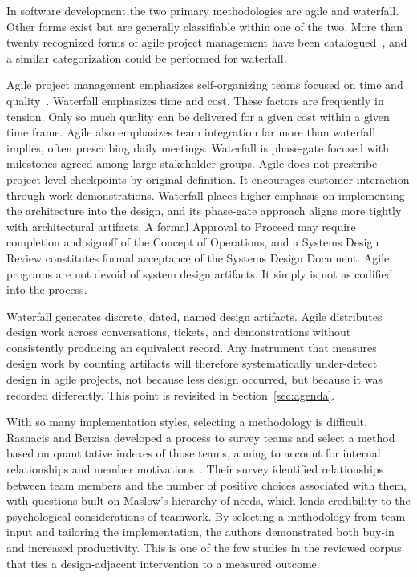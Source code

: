 \documentclass{csimq}
\begin{document}
In software development the two primary methodologies are agile and waterfall.
Other forms exist but are generally classifiable within one of the two. More
than twenty recognized forms of agile project management have been
catalogued~\cite{rasnacis2017}, and a similar categorization could be performed
for waterfall.

Agile project management emphasizes self-organizing teams focused on time and
quality~\cite{sliger2011,rasnacis2017}. Waterfall emphasizes time and cost.
These factors are frequently in tension. Only so much quality can be delivered
for a given cost within a given time frame. Agile also emphasizes team
integration far more than waterfall implies, often prescribing daily meetings.
Waterfall is phase-gate focused with milestones agreed among large
stakeholder groups. Agile does not prescribe project-level checkpoints by original definition. It
encourages customer interaction through work demonstrations. Waterfall places
higher emphasis on implementing the architecture into the design, and its
phase-gate approach aligns more tightly with architectural artifacts. A formal
Approval to Proceed may require completion and signoff of the Concept of Operations, and a Systems Design Review constitutes formal acceptance of the Systems Design Document. Agile programs are not devoid of system design artifacts. It simply is not as codified into the process.

Waterfall generates discrete, dated, named design artifacts. Agile distributes design work across
conversations, tickets, and demonstrations without consistently producing an equivalent
record. Any instrument that measures design work by counting artifacts will
therefore systematically under-detect design in agile projects, not because
less design occurred, but because it was recorded differently. This point is
revisited in Section~\ref{sec:agenda}.

With so many implementation styles, selecting a methodology is
difficult. Rasnacis and Berzisa developed a process to survey teams and select a
method based on quantitative indexes of those teams, aiming to account for
internal relationships and member motivations~\cite{rasnacis2017}. Their survey
identified relationships between team members and the number of positive choices
associated with them, with questions built on Maslow's hierarchy of needs, which
lends credibility to the psychological considerations of teamwork. By selecting
a methodology from team input and tailoring the implementation, the authors
demonstrated both buy-in and increased productivity. This is one of the few
studies in the reviewed corpus that ties a design-adjacent intervention to a
measured outcome.
\end{document}
